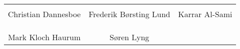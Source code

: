 \phantom{Luft}

\phantom{Luft}
\vspace{5 cm}
\begin{table}[H]
	\vspace{3 cm}
	\centering
		\begin{tabular}{c c c}
			\underline{\phantom{mmmmmmmmmmmmmm}} & \underline{\phantom{mmmmmmmmmmmmmm}} & \underline{\phantom{mmmmmmmmmmmmmm}} \\
			Christian Dannesboe			& Frederik Børsting Lund 		& Karrar Al-Sami 			\\
			&&\\
			&&\\
			\underline{\phantom{mmmmmmmmmmmmmm}} &  \underline{\phantom{mmmmmmmmmmmmmm}} \\
			Mark Kloch Haurum			& Søren Lyng \\										
		\end{tabular}
\end{table}
\newpage